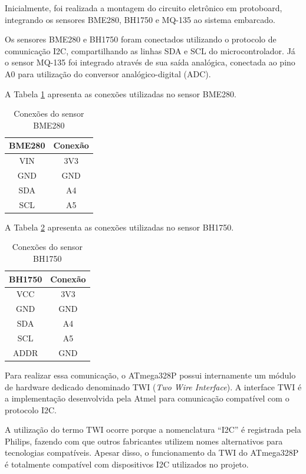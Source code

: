 \documentclass[a4paper,12pt]{article}
\begin{document}
Inicialmente, foi realizada a montagem do circuito eletrônico em protoboard, integrando os sensores BME280, BH1750 e MQ-135 ao sistema embarcado.

Os sensores BME280 e BH1750 foram conectados utilizando o protocolo de comunicação I2C, compartilhando as linhas SDA e SCL do microcontrolador. Já o sensor MQ-135 foi integrado através de sua saída analógica, conectada ao pino A0 para utilização do conversor analógico-digital (ADC).

A Tabela \ref{tab:bme280} apresenta as conexões utilizadas no sensor BME280.

\begin{table}[H]
\centering
\caption{Conexões do sensor BME280}
\label{tab:bme280}
\begin{tabular}{|c|c|}
\hline
\textbf{BME280} & \textbf{Conexão} \\ \hline
VIN & 3V3 \\ \hline
GND & GND \\ \hline
SDA & A4 \\ \hline
SCL & A5 \\ \hline
\end{tabular}
\end{table}

A Tabela \ref{tab:bh1750} apresenta as conexões utilizadas no sensor BH1750.

\begin{table}[H]
\centering
\caption{Conexões do sensor BH1750}
\label{tab:bh1750}
\begin{tabular}{|c|c|}
\hline
\textbf{BH1750} & \textbf{Conexão} \\ \hline
VCC & 3V3 \\ \hline
GND & GND \\ \hline
SDA & A4 \\ \hline
SCL & A5 \\ \hline
ADDR & GND \\ \hline
\end{tabular}
\end{table}

Para realizar essa comunicação, o ATmega328P possui internamente um módulo de hardware dedicado denominado TWI (\textit{Two Wire Interface}). A interface TWI é a implementação desenvolvida pela Atmel para comunicação compatível com o protocolo I2C.

A utilização do termo TWI ocorre porque a nomenclatura ``I2C'' é registrada pela Philips, fazendo com que outros fabricantes utilizem nomes alternativos para tecnologias compatíveis. Apesar disso, o funcionamento da TWI do ATmega328P é totalmente compatível com dispositivos I2C utilizados no projeto.
\end{document}
